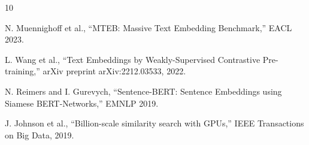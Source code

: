 \documentclass[11pt,letterpaper]{article}
\begin{document}

\begin{thebibliography}{10}

N. Muennighoff et al., ``MTEB: Massive Text Embedding Benchmark,'' EACL 2023.

L. Wang et al., ``Text Embeddings by Weakly-Supervised Contrastive Pre-training,'' arXiv preprint arXiv:2212.03533, 2022.

N. Reimers and I. Gurevych, ``Sentence-BERT: Sentence Embeddings using Siamese BERT-Networks,'' EMNLP 2019.

J. Johnson et al., ``Billion-scale similarity search with GPUs,'' IEEE Transactions on Big Data, 2019.

\end{thebibliography}
\end{document}

